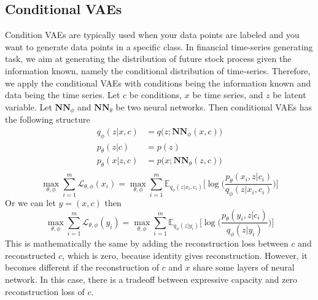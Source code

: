 \documentclass[12pt]{report}
\theoremstyle{definition}
\theoremstyle{remark}
\newcommand{\E}{\mathbb{E}}
\begin{document}
\subsection{Conditional VAEs }
Condition VAEs \cite{sohn2015learning} are typically used when your data points are labeled and you want to generate data points in a specific class. In financial time-series generating task, we aim at generating the distribution of future stock process given the information known, namely the conditional distribution of time-series. Therefore, we apply the conditional VAEs with conditions being the information known and data being the time series. Let $c$ be conditions, $x$ be time series, and $z$ be latent variable. Let $\mathbf{NN}_{\phi}$ and $\mathbf{NN}_{\theta}$ be two neural networks. Then conditional VAEs has the following structure
\begin{equation}
  \begin{split}
    q_{\phi}(z|x,c) &= q\Big(z;\mathbf{NN}_{\phi}(x,c)\Big)\\
    p_{\theta}(z|c) &= p(z)\\
    p_{\theta}(x|z,c) &= p\Big(x;\mathbf{NN}_{\theta}(z,c)\Big)\\
  \end{split}
\end{equation} 
\begin{equation}
  \max_{\theta, \phi}\sum_{i=1}^{m}\mathcal{L}_{\theta, \phi}(x_{i}) = \max_{\theta, \phi}\sum_{i=1}^{m}\E_{q_{\phi}(z|x_{i},c_{i})}\bigg[\log\Big( \frac{p_{\theta}(x_{i},z|c_{i})}{q_{\phi}(z|x_{i},c_{i})}\Big)\bigg]
\end{equation}
Or we can let $y = (x,c)$ then 
\begin{equation}
  \max_{\theta, \phi}\sum_{i=1}^{m}\mathcal{L}_{\theta, \phi}(y_{i}) = \max_{\theta, \phi}\sum_{i=1}^{m}\E_{q_{\phi}(z|y_{i})}\bigg[\log\Big( \frac{p_{\theta}(y_{i},z|c_{i})}{q_{\phi}(z|y_{i})}\Big)\bigg]
\end{equation}
This is mathematically the same by adding the reconstruction loss between $c$ and reconstructed $c$, which is zero, because identity gives reconstruction. However, it becomes different if the reconstruction of $c$ and $x$ share some layers of neural network. In this case, there is a tradeoff between expressive capacity and zero reconstruction loss of $c$.
\end{document}
